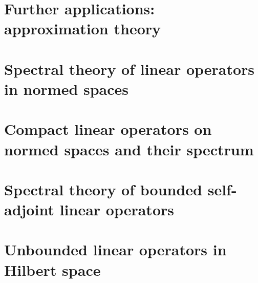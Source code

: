 \documentclass{bookSolutions}
\begin{document}
\chapter{Further applications: approximation theory}







\chapter{Spectral theory of linear operators in normed spaces}








\chapter{Compact linear operators on normed spaces and their spectrum}








\chapter{Spectral theory of bounded self-adjoint linear operators}












\chapter{Unbounded linear operators in Hilbert space}







\end{document}

